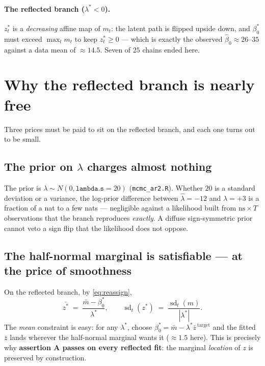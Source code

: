 \documentclass[11pt]{article}
\newcommand{\code}[1]{\texttt{#1}}
\DeclareMathOperator{\sd}{sd}
\begin{document}
\paragraph{The reflected branch ($\lambda^\ast < 0$).} $z^\ast_t$ is a
\emph{decreasing} affine map of $m_t$: the latent path is flipped upside down,
and $\beta_0^\ast$ must exceed $\max_t m_t$ to keep $z^\ast_t \ge 0$ --- which
is exactly the observed $\hat\beta_0 \approx 26$--$35$ against a data mean of
$\approx 14.5$. Seven of $25$ chains ended here.

\section{Why the reflected branch is nearly free}

Three prices must be paid to sit on the reflected branch, and each one turns
out to be small.

\subsection{The prior on $\lambda$ charges almost nothing}

The prior is $\lambda \sim N(0, \code{lambda.s} = 20)$
(\code{mcmc\_ar2.R}). Whether $20$ is a standard deviation or a variance, the
log-prior difference between $\hat\lambda = -12$ and $\lambda = +3$ is a
fraction of a nat to a few nats --- negligible against a likelihood built from
$\text{ns} \times T$ observations that the branch reproduces \emph{exactly}.
A diffuse sign-symmetric prior cannot veto a sign flip that the likelihood
does not oppose.

\subsection{The half-normal marginal is satisfiable --- at the price of
smoothness}

On the reflected branch, by \eqref{eq:reassign},
\begin{equation}
  \bar{z^\ast} \;=\; \frac{\bar m - \beta_0^\ast}{\lambda^\ast},
  \qquad
  \sd_t(z^\ast) \;=\; \frac{\sd_t(m)}{|\lambda^\ast|} .
  \label{eq:shrink}
\end{equation}
The \emph{mean} constraint is easy: for any $\lambda^\ast$, choose
$\beta_0^\ast = \bar m - \lambda^\ast \bar z^{\,\text{target}}$ and the fitted
$\bar z$ lands wherever the half-normal marginal wants it ($\approx 1.5$ here).
This is precisely why \textbf{assertion A passes on every reflected fit}: the
marginal \emph{location} of $z$ is preserved by construction.
\end{document}
